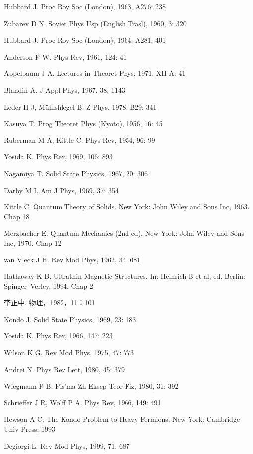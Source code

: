 \begin{canKao}
\begin{enumerate}[label={[\arabic*]}, leftmargin=2.2em, itemsep=0pt]
\item Hubbard J. Proc Roy Soc (London), 1963, A276: 238
\item Zubarev D N. Soviet Phys Usp (English Trasl), 1960, 3: 320
\item Hubbard J. Proc Roy Soc (London), 1964, A281: 401
\item Anderson P W. Phys Rev, 1961, 124: 41
\item Appelbaum J A. Lectures in Theoret Phys, 1971, XII-A: 41
\item Blandin A. J Appl Phys, 1967, 38: 1143
\item Leder H J, Mühlshlegel B. Z Phys, 1978, B29: 341
\item Kasuya T. Prog Theoret Phys (Kyoto), 1956, 16: 45
\item Ruberman M A, Kittle C. Phys Rev, 1954, 96: 99
\item Yosida K. Phys Rev, 1969, 106: 893
\item Nagamiya T. Solid State Physics, 1967, 20: 306
\item Darby M I. Am J Phys, 1969, 37: 354
\item Kittle C. Quantum Theory of Solids. New York: John Wiley and Sons Inc, 1963. Chap 18
\item Merzbacher E. Quantum Mechanics (2nd ed). New York: John Wiley and Sons Inc, 1970. Chap 12
\item van Vleck J H. Rev Mod Phys, 1962, 34: 681
\item Hathaway K B. Ultrathin Magnetic Structures. In: Heinrich B et al, ed. Berlin: Spinger--Verley, 1994. Chap 2
\item 李正中. 物理，1982，11：101
\item Kondo J. Solid State Physics, 1969, 23: 183
\item Yosida K. Phys Rev, 1966, 147: 223
\item Wilson K G. Rev Mod Phys, 1975, 47: 773
\item Andrei N. Phys Rev Lett, 1980, 45: 379
\item Wiegmann P B. Pis'ma Zh Eksep Teor Fiz, 1980, 31: 392
\item Schrieffer J R, Wolff P A. Phys Rev, 1966, 149: 491
\item Hewson A C. The Kondo Problem to Heavy Fermions. New York: Cambridge Univ Press, 1993
\item Degiorgi L. Rev Mod Phys, 1999, 71: 687

\end{enumerate}
\end{canKao}
